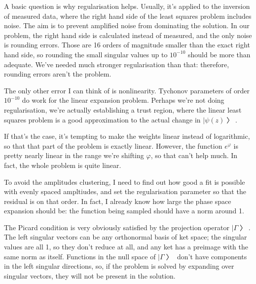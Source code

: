 
A basic question is why regularisation helps.  Usually, it's applied to the inversion of measured data, where the right hand side of the least squares problem includes noise.  The aim is to prevent amplified noise from dominating the solution.  In our problem, the right hand side is calculated instead of measured, and the only noise is rounding errors.  Those are 16 orders of magnitude smaller than the exact right hand side, so rounding the small singular values up to $10^{-10}$ should be more than adequate.  We've needed much stronger regularisation than that: therefore, rounding errors aren't the problem.

The only other error I can think of is nonlinearity.  Tychonov parameters of order $10^{-10}$ do work for the linear expansion problem.  Perhaps we're not doing regularisation, we're actually establishing a trust region, where the linear least squares problem is a good approximation to the actual change in $|ψ(z)〉$.

If that's the case, it's tempting to make the weights linear instead of logarithmic, so that that part of the problem is exactly linear.  However, the function $e^φ$ is pretty nearly linear in the range we're shifting $φ$, so that can't help much.  In fact, the whole problem is quite linear.

To avoid the amplitudes clustering, I need to find out how good a fit is possible with evenly spaced ampltiudes, and set the regularisation parameter so that the residual is on that order.  In fact, I already know how large the phase space expansion should be: the function being sampled should have a norm around 1.

The Picard condition is very obviously satisfied by the projection operator $|Γ〉$.  The left singular vectors can be any orthonormal basis of ket space; the singular values are all 1, so they don't reduce at all, and any ket has a preimage with the same norm as itself.  Functions in the null space of $|Γ〉$ don't have components in the left singular directions, so, if the problem is solved by expanding over singular vectors, they will not be present in the solution. 


